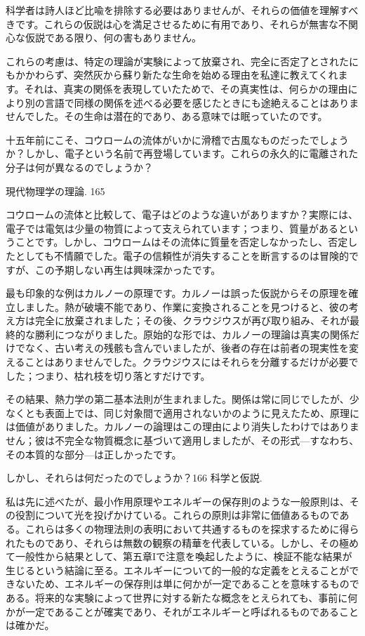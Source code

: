 \documentclass[a4paper,11pt,openany]{ltjsbook}
\begin{document}
科学者は詩人ほど比喩を排除する必要はありませんが、それらの価値を理解すべきです。これらの仮説は心を満足させるために有用であり、それらが無害な不関心な仮説である限り、何の害もありません。

これらの考慮は、特定の理論が実験によって放棄され、完全に否定了とされたにもかかわらず、突然灰から蘇り新たな生命を始める理由を私達に教えてくれます。それは、真実の関係を表現していたためで、その真実性は、何らかの理由により別の言語で同様の関係を述べる必要を感じたときにも途絶えることはありませんでした。その生命は潜在的であり、ある意味では眠っていたのです。

十五年前にこそ、コウロームの流体がいかに滑稽で古風なものだったでしょうか？しかし、電子という名前で再登場しています。これらの永久的に電離された分子は何が異なるのでしょうか？

現代物理学の理論. 165

コウロームの流体と比較して、電子はどのような違いがありますか？実際には、電子では電気は少量の物質によって支えられています；つまり、質量があるということです。しかし、コウロームはその流体に質量を否定しなかったし、否定したとしても不情願でした。電子の信頼性が消失することを断言するのは冒険的ですが、この予期しない再生は興味深かったです。

最も印象的な例はカルノーの原理です。カルノーは誤った仮説からその原理を確立しました。熱が破壊不能であり、作業に変換されることを見つけると、彼の考え方は完全に放棄されました；その後、クラウジウスが再び取り組み、それが最終的な勝利につながりました。原始的な形では、カルノーの理論は真実の関係だけでなく、古い考えの残骸も含んでいましたが、後者の存在は前者の現実性を変えることはありませんでした。クラウジウスにはそれらを分離するだけが必要でした；つまり、枯れ枝を切り落とすだけです。

その結果、熱力学の第二基本法則が生まれました。関係は常に同じでしたが、少なくとも表面上では、同じ対象間で適用されないかのように見えたため、原理には価値がありました。カルノーの論理はこの理由により消失したわけではありません；彼は不完全な物質概念に基づいて適用しましたが、その形式—すなわち、その本質的な部分—は正しかったです。

しかし、それらは何だったのでしょうか？166 科学と仮説.

私は先に述べたが、最小作用原理やエネルギーの保存則のような一般原則は、その役割について光を投げかけている。これらの原則は非常に価値あるものである。これらは多くの物理法則の表明において共通するものを探求するために得られたものであり、それらは無数の観察の精華を代表している。しかし、その極めて一般性から結果として、第五章Iで注意を喚起したように、検証不能な結果が生じるという結論に至る。エネルギーについて的一般的な定義をとえることができないため、エネルギーの保存則は単に何かが一定であることを意味するものである。将来的な実験によって世界に対する新たな概念をとえられても、事前に何かが一定であることが確実であり、それがエネルギーと呼ばれるものであることは確かだ。
\end{document}
